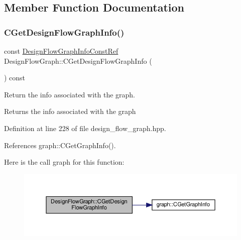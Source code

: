 \subsection{Member Function Documentation}
\mbox{\label{classDesignFlowGraph_a1f75898d82ee634a63c9be38196dabb4}} 
\subsubsection{\texorpdfstring{C\+Get\+Design\+Flow\+Graph\+Info()}{CGetDesignFlowGraphInfo()}}
{\footnotesize\ttfamily const \hyperlink{design__flow__graph_8hpp_a85b5e7eb34f1a41b5acbd96cf370cc16}{Design\+Flow\+Graph\+Info\+Const\+Ref} Design\+Flow\+Graph\+::\+C\+Get\+Design\+Flow\+Graph\+Info (\begin{DoxyParamCaption}{ }\end{DoxyParamCaption}) const\hspace{0.3cm}{\ttfamily [inline]}}



Return the info associated with the graph. 

\begin{DoxyReturn}{Returns}
the info associated with the graph 
\end{DoxyReturn}


Definition at line 228 of file design\+\_\+flow\+\_\+graph.\+hpp.



References graph\+::\+C\+Get\+Graph\+Info().

Here is the call graph for this function\+:
\nopagebreak
\begin{figure}[H]
\begin{center}
\leavevmode
\includegraphics[width=350pt]{de/de0/classDesignFlowGraph_a1f75898d82ee634a63c9be38196dabb4_cgraph}
\end{center}
\end{figure}
\mbox{\label{classDesignFlowGraph_a04cf3b9917f596b49d6bc3aae722c896}} 
